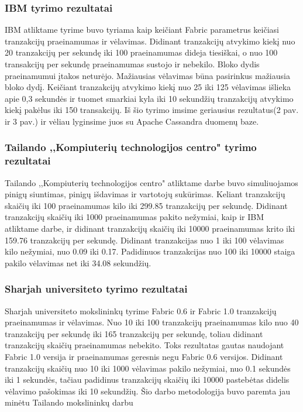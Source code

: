 \documentclass{VUMIFPSkursinis}
\begin{document}
		\subsubsection{IBM tyrimo rezultatai}
			IBM atliktame tyrime \cite{IMBResearch} buvo tyriama kaip keičiant Fabric parametrus keičiasi tranzakcijų praeinamumas ir vėlavimas. Didinant tranzakcijų atvykimo kiekį nuo 20 tranzakcijų per sekundę iki 100 praeinamumas dideja tiesiškai, o nuo 100 transakcijų per sekundę praeinamumas sustojo ir nebekilo. Bloko dydis praeinamumui įtakos neturėjo. 
			\newline
			Mažiausias vėlavimas būna pasirinkus mažiausia bloko dydį. Keičiant tranzakcijų atvykimo kiekį nuo 25 iki 125 vėlavimas išlieka apie 0,3 sekundės ir tuomet smarkiai kyla iki 10 sekundžių tranzakcijų 
			atvykimo kiekį pakėlus iki 150 transakcijų. 
			\newline
			Iš šio tyrimo imsime geriausius rezultatus(2 pav. ir 3 pav.) ir vėliau lyginsime juos su Apache Cassandra duomenų baze. 
		\subsubsection{Tailando ,,Kompiuterių technologijos centro" tyrimo rezultatai}
			Tailando ,,Kompiuterių technologijos centro" atliktame darbe \cite{ThailandPerf} buvo simuliuojamos pinigų siuntimas, pinigų išdavimas ir vartotojų sukūrimas. Keliant tranzakcijų skaičių iki 100 praeinamumas kilo iki 299.85 tranzakcijų per sekundę. Didinant tranzakcijų skaičių iki 1000 praeinamumas pakito nežymiai, kaip ir IBM \cite{IMBResearch} atliktame darbe, ir didinant tranzakcijų skaičių iki 10000 praeinamumas krito iki 159.76 tranzakcijų per sekundę. 
			Didinant tranzakcijas nuo 1 iki 100 vėlavimas kilo nežymiai, nuo 0.09 iki 0.17. Padidinuos tranzakcijas nuo 100 iki 10000 staiga pakilo vėlavimas net iki 34.08 sekundžių.
		\subsubsection{Sharjah universiteto tyrimo rezultatai}
			Sharjah universiteto mokslininkų tyrime \cite{ShaFabPerf} Fabric 0.6 ir Fabric 1.0 tranzakcijų praeinamumas ir vėlavimas. Nuo 10 iki 100 tranzakcijų praeinamumas kilo nuo 40 tranzakcijų per sekundę iki 165 tranzakcijų per sekundę, toliau didinant tranzakcijų skaičių praeinamumas nebekito. Toks rezultatas gautas naudojant Fabric 1.0 versija ir praeinamumas geresnis negu 					Fabric 0.6 versijos. 
			Didinant tranzakcijų skaičių nuo 10 iki 1000 vėlavimas pakilo nežymiai, nuo 0.1 sekundės iki 1 sekundės, tačiau padidinus tranzakcijų skaičių iki 10000 pastebėtas didelis vėlavimo pašokimas iki 10 sekundžių.
			Šio darbo metodologija buvo paremta jau minėtu Tailando mokslininkų darbu \cite{ThailandPerf}
\end{document}
